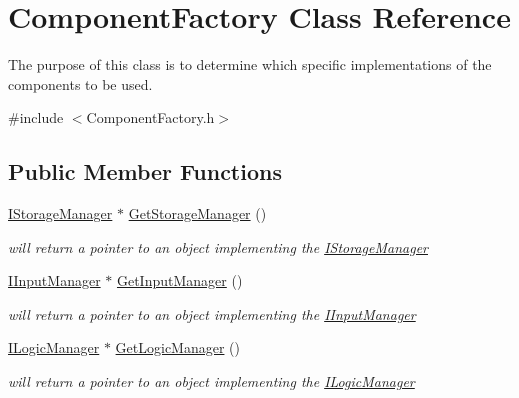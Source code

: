 \hypertarget{class_component_factory}{}\section{Component\+Factory Class Reference}
\label{class_component_factory}


The purpose of this class is to determine which specific implementations of the components to be used.  




{\ttfamily \#include $<$Component\+Factory.\+h$>$}

\subsection*{Public Member Functions}
\begin{DoxyCompactItemize}
\item 
\mbox{\label{class_component_factory_aa6178ddfecc39747ef12f11606735e09}} 
\mbox{\hyperlink{class_i_storage_manager}{I\+Storage\+Manager}} $\ast$ \mbox{\hyperlink{class_component_factory_aa6178ddfecc39747ef12f11606735e09}{Get\+Storage\+Manager}} ()
\begin{DoxyCompactList}\small\item\em will return a pointer to an object implementing the \mbox{\hyperlink{class_i_storage_manager}{I\+Storage\+Manager}} \end{DoxyCompactList}\item 
\mbox{\label{class_component_factory_a84613a5a5f11003abd9d10620ca72b5b}} 
\mbox{\hyperlink{class_i_input_manager}{I\+Input\+Manager}} $\ast$ \mbox{\hyperlink{class_component_factory_a84613a5a5f11003abd9d10620ca72b5b}{Get\+Input\+Manager}} ()
\begin{DoxyCompactList}\small\item\em will return a pointer to an object implementing the \mbox{\hyperlink{class_i_input_manager}{I\+Input\+Manager}} \end{DoxyCompactList}\item 
\mbox{\label{class_component_factory_aa8a3b17c86c562cc69f50f283ed3cc28}} 
\mbox{\hyperlink{class_i_logic_manager}{I\+Logic\+Manager}} $\ast$ \mbox{\hyperlink{class_component_factory_aa8a3b17c86c562cc69f50f283ed3cc28}{Get\+Logic\+Manager}} ()
\begin{DoxyCompactList}\small\item\em will return a pointer to an object implementing the \mbox{\hyperlink{class_i_logic_manager}{I\+Logic\+Manager}} \end{DoxyCompactList}\item 

\end{DoxyCompactItemize}
